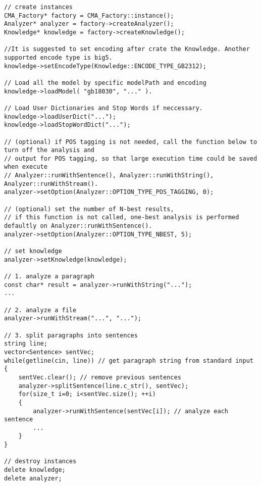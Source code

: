 \begin{Code}\begin{verbatim}// create instances
CMA_Factory* factory = CMA_Factory::instance();
Analyzer* analyzer = factory->createAnalyzer();
Knowledge* knowledge = factory->createKnowledge();

//It is suggested to set encoding after crate the Knowledge. Another supported encode type is big5.
knowledge->setEncodeType(Knowledge::ENCODE_TYPE_GB2312);

// Load all the model by specific modelPath and encoding
knowledge->loadModel( "gb18030", "..." ).

// Load User Dictionaries and Stop Words if neccessary.
knowledge->loadUserDict("...");
knowledge->loadStopWordDict("...");
 
// (optional) if POS tagging is not needed, call the function below to turn off the analysis and 
// output for POS tagging, so that large execution time could be saved when execute 
// Analyzer::runWithSentence(), Analyzer::runWithString(), Analyzer::runWithStream().
analyzer->setOption(Analyzer::OPTION_TYPE_POS_TAGGING, 0);

// (optional) set the number of N-best results,
// if this function is not called, one-best analysis is performed defaultly on Analyzer::runWithSentence().
analyzer->setOption(Analyzer::OPTION_TYPE_NBEST, 5);

// set knowledge
analyzer->setKnowledge(knowledge);

// 1. analyze a paragraph
const char* result = analyzer->runWithString("...");
...

// 2. analyze a file
analyzer->runWithStream("...", "...");

// 3. split paragraphs into sentences
string line;
vector<Sentence> sentVec;
while(getline(cin, line)) // get paragraph string from standard input
{
    sentVec.clear(); // remove previous sentences
    analyzer->splitSentence(line.c_str(), sentVec);
    for(size_t i=0; i<sentVec.size(); ++i)
    {
        analyzer->runWithSentence(sentVec[i]); // analyze each sentence
        ...
    }
}

// destroy instances
delete knowledge;
delete analyzer;
\end{verbatim}
\end{Code}

 